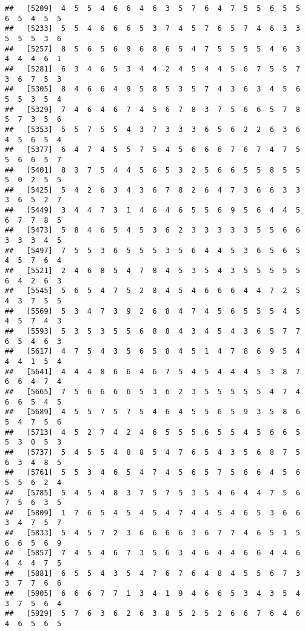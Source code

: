\documentclass[
]{book}
\begin{document}
\begin{verbatim}
##   [5209]  4  5  5  4  6  6  4  6  3  5  7  6  4  7  5  5  6  5  5  6  5  4  5  5
##   [5233]  5  5  4  6  6  6  5  3  7  4  5  7  6  5  7  4  6  3  3  5  5  5  3  6
##   [5257]  8  5  6  5  6  9  6  8  6  5  4  7  5  5  5  5  4  6  3  4  4  4  6  1
##   [5281]  6  3  4  6  5  3  4  4  2  4  5  4  4  5  6  7  5  5  7  3  6  7  5  3
##   [5305]  8  4  6  6  4  9  5  8  5  3  5  7  4  3  6  3  4  5  6  5  5  3  5  4
##   [5329]  7  4  6  4  6  7  4  5  6  7  8  3  7  5  6  6  5  7  8  5  7  3  5  6
##   [5353]  5  5  7  5  5  4  3  7  3  3  3  6  5  6  2  2  6  3  6  4  5  6  5  4
##   [5377]  6  4  7  4  5  5  7  5  4  5  6  6  6  7  6  7  4  7  5  5  6  6  5  7
##   [5401]  8  3  7  5  4  4  5  6  5  3  2  5  6  6  5  5  8  5  5  5  0  2  5  5
##   [5425]  5  4  2  6  3  4  3  6  7  8  2  6  4  7  3  6  6  3  3  3  6  5  2  7
##   [5449]  3  4  4  7  3  1  4  6  4  6  5  5  6  9  5  6  4  4  5  6  7  7  8  5
##   [5473]  5  8  4  6  5  4  5  3  6  2  3  3  3  3  3  5  5  6  6  3  3  3  4  5
##   [5497]  7  5  5  3  6  5  5  5  3  5  6  4  4  5  3  6  5  6  5  4  5  7  6  4
##   [5521]  2  4  6  8  5  4  7  8  4  5  3  5  4  3  5  5  5  5  5  6  4  2  6  3
##   [5545]  5  6  5  4  7  5  2  8  4  5  4  6  6  6  4  4  7  2  5  4  3  7  5  5
##   [5569]  5  3  4  7  3  9  2  6  8  4  7  4  5  6  5  5  5  4  5  4  5  7  4  3
##   [5593]  5  3  5  3  5  5  6  8  8  4  3  4  5  4  3  6  5  7  7  6  5  4  6  3
##   [5617]  4  7  5  4  3  5  6  5  8  4  5  1  4  7  8  6  9  5  4  4  4  1  5  4
##   [5641]  4  4  4  8  6  6  4  6  7  5  4  5  4  4  4  5  3  8  7  6  6  4  7  4
##   [5665]  7  5  6  6  6  6  5  3  6  2  3  5  5  5  5  5  4  7  4  6  6  5  4  5
##   [5689]  4  5  5  7  5  7  5  4  6  4  5  5  6  5  9  3  5  8  6  5  4  7  5  6
##   [5713]  4  5  2  7  4  2  4  6  5  5  5  6  5  5  4  5  6  6  5  5  3  0  5  3
##   [5737]  5  4  5  5  4  8  8  5  4  7  6  5  4  3  5  6  8  7  5  6  3  4  8  5
##   [5761]  5  5  3  4  6  5  4  7  4  5  6  5  7  5  6  6  4  5  6  5  5  6  2  4
##   [5785]  5  4  5  4  8  3  7  5  7  5  3  5  4  6  4  4  7  5  6  7  5  6  3  5
##   [5809]  1  7  6  5  4  5  4  5  4  7  4  4  5  4  6  5  3  6  6  3  4  7  5  7
##   [5833]  5  4  5  7  2  3  6  6  6  6  3  6  7  7  4  6  5  1  5  6  6  5  6  9
##   [5857]  7  4  5  4  6  7  3  5  6  3  4  6  4  4  6  6  4  4  6  4  4  4  7  5
##   [5881]  6  5  5  4  3  5  4  7  6  7  6  4  8  4  5  5  6  7  3  3  7  7  6  6
##   [5905]  6  6  6  7  7  1  3  4  1  9  4  6  6  5  3  4  3  5  4  3  7  5  6  4
##   [5929]  5  7  6  3  6  2  6  3  8  5  2  5  2  6  6  7  6  4  6  4  6  5  6  5

\end{verbatim}
\end{document}
